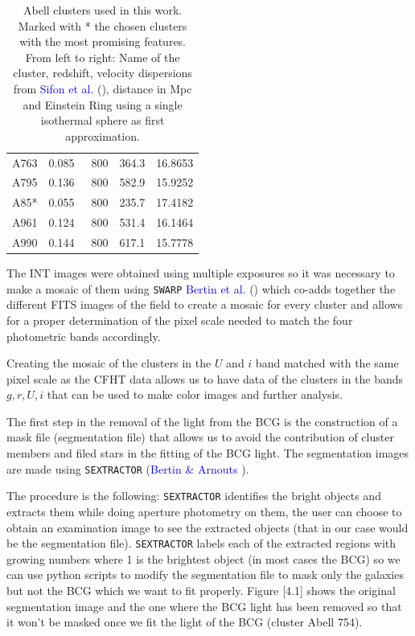 \begin{table}[H]
\begin{tabular}{ccccc}
A763    & 0.085 & ~800           & 364.3 & 16.8653   \\
A795    & 0.136 & ~800           & 582.9 & 15.9252   \\
A85*    & 0.055 & ~800           & 235.7 & 17.4182   \\
A961    & 0.124 & ~800           & 531.4 & 16.1464   \\
A990    & 0.144 & ~800           & 617.1 & 15.7778   
\end{tabular}
\caption[Abell Clusters and their redshift]{Abell clusters used in this work. Marked with * the chosen clusters with the most promising features. From left to right: Name of the cluster, redshift, velocity dispersions from \textcolor{blue}{Sifon et al.} (\citeyear{Reference6}), distance in Mpc and Einstein Ring using a single isothermal sphere as first approximation.}
\end{table}

The INT images were obtained using multiple exposures so it was necessary to make a mosaic of them using \texttt{SWARP} \textcolor{blue}{Bertin et al.} (\citeyear{Reference29}) which co-adds together the different FITS images of the field to create a mosaic for every cluster and allows for a proper determination of the pixel scale needed to match the four photometric bands accordingly. 

Creating the mosaic of the clusters in the $U$ and $i$ band matched with the same pixel scale as the CFHT data allows us to have data of the clusters in the bands $g,r,U,i$ that can be used to make color images and further analysis.

 The first step in the removal of the light from the BCG is the construction of a mask file (segmentation file) that allows us to avoid the contribution of cluster members and filed stars in the fitting of the BCG light. The segmentation images are made using \texttt{SEXTRACTOR} (\textcolor{blue}{Bertin \& Arnouts} \citeyear{Reference27}). 

The procedure is the following: \texttt{SEXTRACTOR} identifies the bright objects and extracts them while doing aperture photometry on them, the user can choose to obtain an examination image to see the extracted objects (that in our case would be the segmentation file). \texttt{SEXTRACTOR} labels each of the extracted regions with growing numbers where 1 is the brightest object (in most cases the BCG) so we can use python scripts to modify the segmentation file to mask only the galaxies but not the BCG which we want to fit properly. Figure [4.1] shows the original segmentation image and the one where the BCG light has been removed so that it won't be masked once we fit the light of the BCG (cluster Abell 754). 


